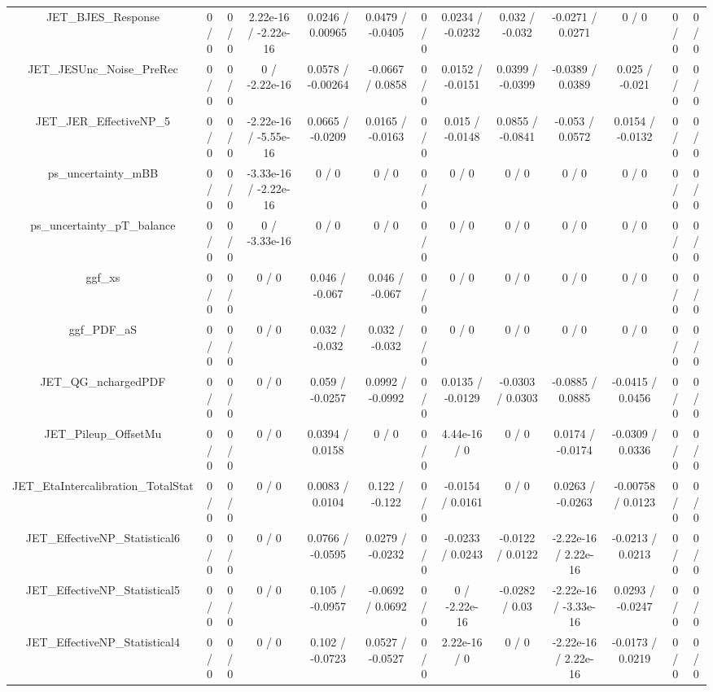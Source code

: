 \documentclass[10pt]{article}
\begin{document}
\begin{table}[htbp]
\begin{center}
\begin{tabular}{|c|c|c|c|c|c|c|c|c|c|c|c|c|}
  JET_BJES_Response & 0 / 0 & 0 / 0 & 2.22e-16 / -2.22e-16 & 0.0246 / 0.00965 & 0.0479 / -0.0405 & 0 / 0 & 0.0234 / -0.0232 & 0.032 / -0.032 & -0.0271 / 0.0271 & 0 / 0 & 0 / 0 & 0 / 0 \\ 
  JET_JESUnc_Noise_PreRec & 0 / 0 & 0 / 0 & 0 / -2.22e-16 & 0.0578 / -0.00264 & -0.0667 / 0.0858 & 0 / 0 & 0.0152 / -0.0151 & 0.0399 / -0.0399 & -0.0389 / 0.0389 & 0.025 / -0.021 & 0 / 0 & 0 / 0 \\ 
  JET_JER_EffectiveNP_5 & 0 / 0 & 0 / 0 & -2.22e-16 / -5.55e-16 & 0.0665 / -0.0209 & 0.0165 / -0.0163 & 0 / 0 & 0.015 / -0.0148 & 0.0855 / -0.0841 & -0.053 / 0.0572 & 0.0154 / -0.0132 & 0 / 0 & 0 / 0 \\ 
  ps_uncertainty_mBB & 0 / 0 & 0 / 0 & -3.33e-16 / -2.22e-16 & 0 / 0 & 0 / 0 & 0 / 0 & 0 / 0 & 0 / 0 & 0 / 0 & 0 / 0 & 0 / 0 & 0 / 0 \\ 
  ps_uncertainty_pT_balance & 0 / 0 & 0 / 0 & 0 / -3.33e-16 & 0 / 0 & 0 / 0 & 0 / 0 & 0 / 0 & 0 / 0 & 0 / 0 & 0 / 0 & 0 / 0 & 0 / 0 \\ 
  ggf_xs & 0 / 0 & 0 / 0 & 0 / 0 & 0.046 / -0.067 & 0.046 / -0.067 & 0 / 0 & 0 / 0 & 0 / 0 & 0 / 0 & 0 / 0 & 0 / 0 & 0 / 0 \\ 
  ggf_PDF_aS & 0 / 0 & 0 / 0 & 0 / 0 & 0.032 / -0.032 & 0.032 / -0.032 & 0 / 0 & 0 / 0 & 0 / 0 & 0 / 0 & 0 / 0 & 0 / 0 & 0 / 0 \\ 
  JET_QG_nchargedPDF & 0 / 0 & 0 / 0 & 0 / 0 & 0.059 / -0.0257 & 0.0992 / -0.0992 & 0 / 0 & 0.0135 / -0.0129 & -0.0303 / 0.0303 & -0.0885 / 0.0885 & -0.0415 / 0.0456 & 0 / 0 & 0 / 0 \\ 
  JET_Pileup_OffsetMu & 0 / 0 & 0 / 0 & 0 / 0 & 0.0394 / 0.0158 & 0 / 0 & 0 / 0 & 4.44e-16 / 0 & 0 / 0 & 0.0174 / -0.0174 & -0.0309 / 0.0336 & 0 / 0 & 0 / 0 \\ 
  JET_EtaIntercalibration_TotalStat & 0 / 0 & 0 / 0 & 0 / 0 & 0.0083 / 0.0104 & 0.122 / -0.122 & 0 / 0 & -0.0154 / 0.0161 & 0 / 0 & 0.0263 / -0.0263 & -0.00758 / 0.0123 & 0 / 0 & 0 / 0 \\ 
  JET_EffectiveNP_Statistical6 & 0 / 0 & 0 / 0 & 0 / 0 & 0.0766 / -0.0595 & 0.0279 / -0.0232 & 0 / 0 & -0.0233 / 0.0243 & -0.0122 / 0.0122 & -2.22e-16 / 2.22e-16 & -0.0213 / 0.0213 & 0 / 0 & 0 / 0 \\ 
  JET_EffectiveNP_Statistical5 & 0 / 0 & 0 / 0 & 0 / 0 & 0.105 / -0.0957 & -0.0692 / 0.0692 & 0 / 0 & 0 / -2.22e-16 & -0.0282 / 0.03 & -2.22e-16 / -3.33e-16 & 0.0293 / -0.0247 & 0 / 0 & 0 / 0 \\ 
  JET_EffectiveNP_Statistical4 & 0 / 0 & 0 / 0 & 0 / 0 & 0.102 / -0.0723 & 0.0527 / -0.0527 & 0 / 0 & 2.22e-16 / 0 & 0 / 0 & -2.22e-16 / 2.22e-16 & -0.0173 / 0.0219 & 0 / 0 & 0 / 0 \\ 

\end{tabular}
\end{center}
\end{table}
\end{document}
